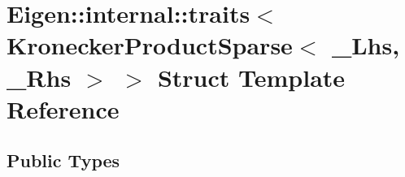 \hypertarget{struct_eigen_1_1internal_1_1traits_3_01_kronecker_product_sparse_3_01___lhs_00_01___rhs_01_4_01_4}{}\section{Eigen\+:\+:internal\+:\+:traits$<$ Kronecker\+Product\+Sparse$<$ \+\_\+\+Lhs, \+\_\+\+Rhs $>$ $>$ Struct Template Reference}
\label{struct_eigen_1_1internal_1_1traits_3_01_kronecker_product_sparse_3_01___lhs_00_01___rhs_01_4_01_4}
\subsection*{Public Types}
